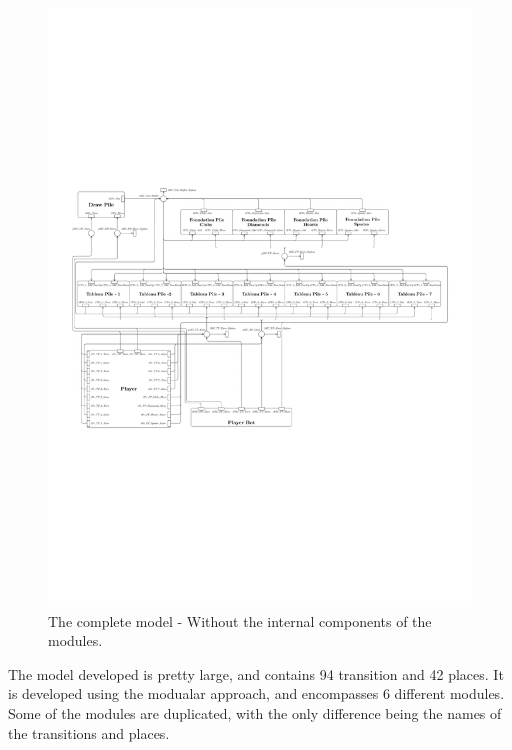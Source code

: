 \documentclass[runningheads,a4paper]{llncs}
\begin{document}
\begin{figure}
	\label{fig:full_horizontal}
	\begin{center} %
		\includegraphics[trim=250 260 230 330,scale=1.1]{images/overallViewPdf}
	\end{center}
	\caption{The complete model - Without the internal components of the modules.}
\end{figure}


The model developed is pretty large, and contains 94 transition and 42 places. It is developed using the modualar approach, and encompasses 6 different modules. Some of the modules are duplicated, with the only difference being the names of the transitions and places.
\newline
\end{document}
